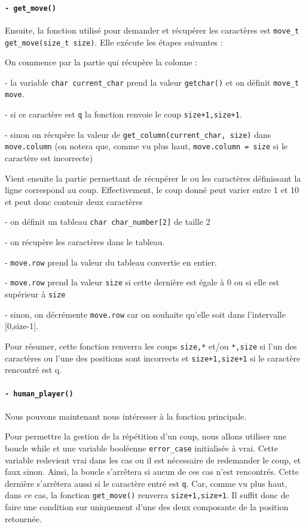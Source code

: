 \documentclass{report}
\begin{document}
\paragraph{\texttt{- get\_move() }}

Ensuite, la fonction utilisé pour demander et récupérer les caractères est \texttt{move\_t get\_move(size\_t size)}. Elle exécute les étapes suivantes :

On commence par la partie qui récupère la colonne :

- la variable \texttt{char current\_char} prend la valeur \texttt{getchar()} et on définit \texttt{move\_t move}.

- si ce caractère est \texttt{q} la fonction renvoie le coup \texttt{{size+1,size+1}}.

- sinon on récupère la valeur de \texttt{get\_column(current\_char, size)} dans \texttt{move.column} (on notera que, comme vu plus haut, \texttt{move.column = size} si le caractère est incorrecte)
\newline

Vient ensuite la partie permettant de récupérer le ou les caractères définissant la ligne correspond au coup. Effectivement, le coup donné peut varier entre 1 et 10 et peut donc contenir deux caractères

- on définit un tableau \texttt{char char\_number[2]} de taille 2

- on récupère les caractères dans le tableau.

- \texttt{move.row} prend la valeur du tableau convertie en entier.

- \texttt{move.row} prend la valeur \texttt{size} si cette dernière est égale à 0 ou si elle est supérieur à \texttt{size}

- sinon, on décrémente \texttt{move.row} car on souhaite qu'elle soit dans l'intervalle [0,size-1].

Pour résumer, cette fonction renverra les coups \texttt{size,*} et/ou \texttt{*,size} si l'un des caractères ou l'une des positions sont incorrects et \texttt{size+1,size+1} si le caractère rencontré est q.

\paragraph{\texttt{- human\_player() }}
Nous pouvons maintenant nous intéresser à la fonction principale.


Pour permettre la gestion de la répétition d'un coup, nous allons utiliser une boucle while et une variable booléenne \texttt{error\_case} initialisée à vrai. Cette variable redevient vrai dans les cas ou il est nécessaire de redemander le coup, et faux sinon. Ainsi, la boucle s'arrêtera si aucun de ces cas n'est rencontrés.
Cette dernière s'arrêtera aussi si le caractère entré est \texttt{q}.
Car, comme vu plus haut, dans ce cas, la fonction \texttt{get\_move()} renverra \texttt{size+1,size+1}. Il suffit donc de faire une condition sur uniquement d'une des deux composante de la position retournée.
\end{document}
